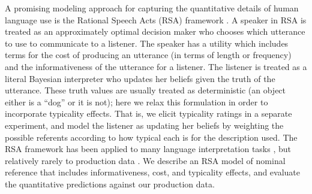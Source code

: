 \documentclass[10pt,letterpaper]{article}
\newcommand{\jd}[1]{\textcolor{Blue}{[jd: #1]}}
\newcommand{\ndg}[1]{\textcolor{Green}{[ndg: #1]}}
\begin{document}

A promising modeling approach for capturing the quantitative details of human language use is the Rational Speech Acts (RSA) framework \cite{frank2012, goodmanstuhlmueller2013}. 
A speaker in RSA is treated as an approximately optimal decision maker who chooses which utterance to use to communicate to a listener.
The speaker has a utility which includes terms for the cost of producing an utterance (in terms of length or frequency) and the informativeness of the utterance for a listener.
The listener is treated as a literal Bayesian interpreter who updates her beliefs given the truth of the utterance.
These truth values are usually treated as deterministic (an object either is a ``dog'' or it is not); here we relax this formulation in order to incorporate typicality effects. 
That is, we elicit typicality ratings in a separate experiment, and model the listener as updating her beliefs by weighting the possible referents according to how typical each is for the description used.
%
The RSA framework has been applied to many language interpretation tasks \cite{goodmanstuhlmueller2013,kao2014,Bergen2016}, but relatively rarely to production data \cite<but see>{franke2014, Orita2015}.
We describe an RSA model of nominal reference that includes informativeness, cost, and typicality effects, and evaluate the quantitative predictions against our production data.


\end{document}
